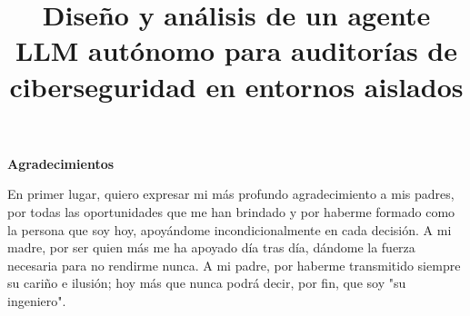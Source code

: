\documentclass[hidelinks, headlogo, framedcover]{tfeEPCC}
\title{Diseño y análisis de un agente LLM autónomo para auditorías de ciberseguridad en entornos aislados}
\begin{document}
\sloppy 
\pagebreak 


\pagestyle{empty}


\pagebreak


\setlength{\parskip}{10pt} %



\cleardoublepage
\newpage
\thispagestyle{empty}

\begin{center}
    \vspace*{-2cm} %
    \Huge \textbf{Agradecimientos}
    \vspace*{1cm}  %
\end{center}

\enlargethispage{2cm}

\noindent En primer lugar, quiero expresar mi más profundo agradecimiento a mis padres, por todas las oportunidades que me han brindado y por haberme formado como la persona que soy hoy, apoyándome incondicionalmente en cada decisión. A mi madre, por ser quien más me ha apoyado día tras día, dándome la fuerza necesaria para no rendirme nunca. A mi padre, por haberme transmitido siempre su cariño e ilusión; hoy más que nunca podrá decir, por fin, que soy "su ingeniero".
\end{document}
